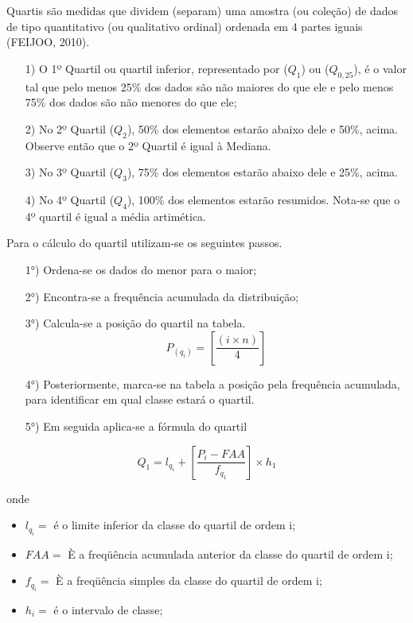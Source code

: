 Quartis são medidas que dividem (separam) uma amostra (ou coleção) de dados de tipo quantitativo (ou qualitativo ordinal) ordenada em 4 partes iguais (FEIJOO, 2010).



\begin{enumerate}
  \item[{1)}] O 1º Quartil ou quartil inferior, representado por ($Q_{1}$) ou ($Q_{0,25}$), é o valor tal que pelo menos 25\% dos dados são não maiores do que ele e pelo menos 75\% dos dados são não menores do que ele;


  
  \item[{2)}] No 2º Quartil ($Q_{2}$), 50\% dos elementos estarão abaixo dele e 50\%, acima. Observe então que o 2º Quartil é igual à Mediana.
  \item[{3)}] No 3º Quartil ($Q_{3}$), 75\% dos elementos estarão abaixo dele e 25\%, acima.
  \vskip0.3cm
 \item[{4)}] No 4º Quartil ($Q_{4}$), 100\% dos elementos estarão resumidos. Nota-se que o 4º quartil é igual a média artimética.
\end{enumerate}


Para o cálculo do quartil utilizam-se os seguintes passos.



\begin{enumerate}

\item [{1°)}] Ordena-se os dados do menor para o maior;
\item [{2°)}] Encontra-se a frequência acumulada da distribuição;
\item [{3°)}]Calcula-se a posição do quartil na tabela.
$$ P_{(q_{i})} = \left[ \frac{(i \times n)}{4}  \right] $$
\item [{4°)}] Posteriormente, marca-se na tabela a posição pela frequência acumulada, para identificar em qual classe estará o quartil.
\item [{5°)}] Em seguida aplica-se a fórmula do quartil
\end{enumerate}

\begin{equation}\label{}
    Q_{1}= l_{q_{i}}+\left[\frac{P_{i}-FAA}{f_{q_{1}}}\right]\times h_{1}
\end{equation}

 onde

 \begin{itemize}
   \item $l_{q_{i}}=$ é o limite inferior da classe do quartil de ordem i;
   \item $FAA=$ È a freqüência acumulada anterior da classe do quartil de ordem i;
   \item $f_{q_{i}}=$ È a freqüência simples da classe do quartil de ordem i;
   \item $h_{i}=$ é o intervalo de classe;
 \end{itemize}




